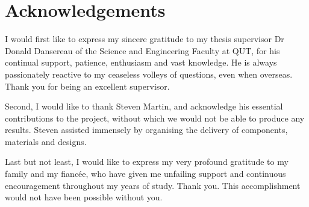 \documentclass[../main.tex]{subfiles}
\begin{document}
\section*{Acknowledgements}
I would first like to express my sincere gratitude to my thesis supervisor Dr Donald Dansereau of the Science and Engineering Faculty at QUT, for his continual support, patience, enthusiasm and vast knowledge. He is always passionately reactive to my ceaseless volleys of questions, even when overseas. Thank you for being an excellent supervisor.

Second, I would like to thank Steven Martin, and acknowledge his essential contributions to the project, without which we would not be able to produce any results. Steven assisted immensely by organising the delivery of components, materials and designs.

Last but not least, I would like to express my very profound gratitude to my family and my fiancée, who have given me unfailing support and continuous encouragement throughout my years of study. Thank you. This accomplishment would not have been possible without you.
\end{document}
